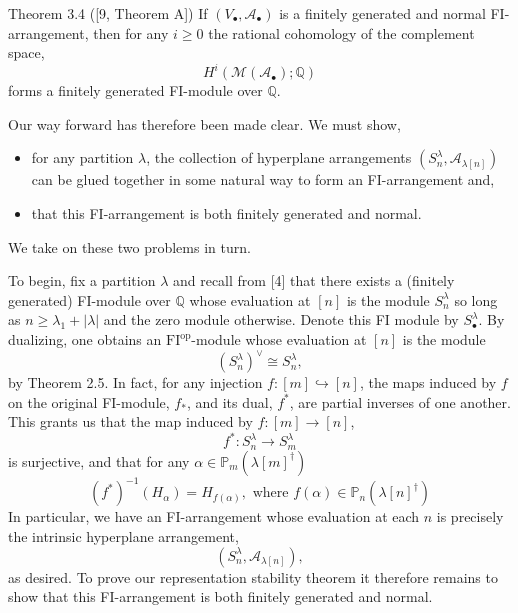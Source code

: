 \begin{sourceblock}{Theorem 3.4 ([9, Theorem A])}
If $(V_\bullet,\mathcal{A}_\bullet)$ is a finitely generated and normal FI-arrangement, then for any $i\geq0$ the rational cohomology of the complement space,
\[
 H^i(\mathcal{M}(\mathcal{A}_\bullet);\mathbb{Q})
\]
forms a finitely generated FI-module over $\mathbb{Q}$.
\end{sourceblock}

Our way forward has therefore been made clear. We must show,
\begin{itemize}
\item for any partition $\lambda$, the collection of hyperplane arrangements $(S_n^\lambda,\mathcal{A}_{\lambda[n]})$ can be glued together in some natural way to form an FI-arrangement and,
\item that this FI-arrangement is both finitely generated and normal.
\end{itemize}
We take on these two problems in turn.

To begin, fix a partition $\lambda$ and recall from [4] that there exists a (finitely generated) FI-module over $\mathbb{Q}$ whose evaluation at $[n]$ is the module $S_n^\lambda$ so long as $n\geq\lambda_1+|\lambda|$ and the zero module otherwise. Denote this FI module by $S_\bullet^\lambda$. By dualizing, one obtains an $\mathrm{FI}^{\mathrm{op}}$-module whose evaluation at $[n]$ is the module
\[
 (S_n^\lambda)^\vee\cong S_n^\lambda,
\]
by Theorem 2.5. In fact, for any injection $f:[m]\hookrightarrow[n]$, the maps induced by $f$ on the original FI-module, $f_*$, and its dual, $f^*$, are partial inverses of one another. This grants us that the map induced by $f:[m]\to[n]$,
\[
 f^*:S_n^\lambda\to S_m^\lambda
\]
is surjective, and that for any $\alpha\in\mathbb{P}_m(\lambda[m]^\dagger)$
\[
 (f^*)^{-1}(H_\alpha)=H_{f(\alpha)},\text{ where }f(\alpha)\in\mathbb{P}_n(\lambda[n]^\dagger)
\]
In particular, we have an FI-arrangement whose evaluation at each $n$ is precisely the intrinsic hyperplane arrangement,
\[
 (S_n^\lambda,\mathcal{A}_{\lambda[n]}),
\]
as desired. To prove our representation stability theorem it therefore remains to show that this FI-arrangement is both finitely generated and normal.

